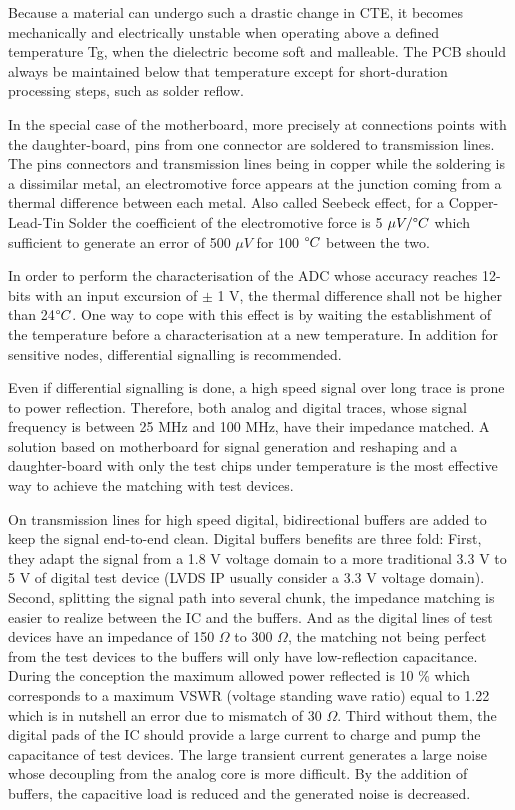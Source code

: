 Because a material can undergo such a drastic change in CTE, it becomes mechanically and electrically unstable when operating above a defined temperature Tg, when the dielectric become soft and malleable. The PCB should always be maintained below that temperature except for short-duration processing steps, such as solder reflow.

In the special case of the motherboard, more precisely at connections points with the daughter-board, pins from one connector are soldered to transmission lines. The pins connectors and transmission lines being in copper while the soldering is a dissimilar metal, an electromotive force appears at the junction coming from a thermal difference between each metal. Also called Seebeck effect, for a Copper-Lead-Tin Solder the coefficient of the electromotive force is 5 \(\mu V/\degree C \) which sufficient to generate an error of 500 \(\mu V\) for 100 \(\degree C\) between the two.

In order to perform the characterisation of the ADC whose accuracy reaches 12-bits with an input excursion of \(\pm \) 1 V, the thermal difference shall not be higher than 24\(\degree C\). One way to cope with this effect is by waiting the establishment of the temperature before a characterisation at a new temperature. In addition for sensitive nodes, differential signalling is recommended.

Even if differential signalling is done, a high speed signal over long trace is prone to power reflection. Therefore, both analog and digital traces, whose signal frequency is between 25 MHz and 100 MHz, have their impedance matched. A solution based on motherboard for signal generation and reshaping and a daughter-board with only the test chips under temperature is the most effective way to achieve the matching with test devices.

On transmission lines for high speed digital, bidirectional buffers are added to keep the signal end-to-end clean. Digital buffers benefits are three fold: First, they adapt the signal from a 1.8 V voltage domain to a more traditional 3.3 V to 5 V of digital test device (LVDS IP usually consider a 3.3 V voltage domain). Second, splitting the signal path into several chunk, the impedance matching is easier to realize between the IC and the buffers. And as the digital lines of test devices have an impedance of 150 \(\Omega \) to 300 \(\Omega \), the matching not being perfect from the test devices to the buffers will only have low-reflection capacitance. During the conception the maximum allowed power reflected is 10 \% which corresponds to a maximum VSWR (voltage standing wave ratio) equal to 1.22 which is in nutshell an error due to mismatch of 30 \(\Omega \). Third without them, the digital pads of the IC should provide a large current to charge and pump the capacitance of test devices. The large transient current generates a large noise whose decoupling from the analog core is more difficult. By the addition of buffers, the capacitive load is reduced and the generated noise is decreased.

